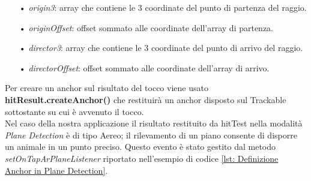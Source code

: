 \documentclass[crop=false, class=book]{standalone}
\begin{document}
	\begin{itemize}
		\item[•] \emph{origin3}: array che contiene le 3 coordinate del punto di partenza del raggio.
		\item[•] \emph{originOffset}: offset sommato alle coordinate dell'array di partenza.
		\item[•] \emph{director3}: array che contiene le 3 coordinate del punto di arrivo del raggio.
		\item[•] \emph{directorOffset}: offset sommato alle coordinate dell'array di arrivo.
	\end{itemize}
	
	\begin{flushleft}
		Per creare un anchor sul risultato del tocco viene usato \textbf{hitResult.createAnchor()} che restituirà un anchor 				disposto sul Trackable sottostante su cui è avvenuto il tocco.\\
		Nel caso della nostra applicazione il risultato restituito da hitTest nella modalità \emph{Plane Detection} è di tipo 			Aereo; il rilevamento di un piano consente di disporre un animale in un punto preciso. Questo evento è stato 					gestito dal metodo \textit{setOnTapArPlaneListener} riportato nell'esempio di codice \vref{lst: Definizione Anchor in 			Plane Detection}.\\
	\end{flushleft}
			
	
\end{document}
